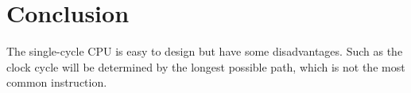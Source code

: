 \documentclass[12pt,a4paper]{article}
\begin{document}

\section{Conclusion}

The single-cycle CPU is easy to design but have some disadvantages.
Such as the clock cycle will be determined by the longest possible path, which is not the most common instruction. 
\end{document}
